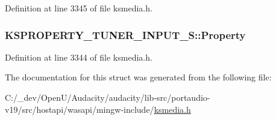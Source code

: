 Definition at line 3345 of file ksmedia.\+h.

\subsubsection[{\texorpdfstring{Property}{Property}}]{ K\+S\+P\+R\+O\+P\+E\+R\+T\+Y\+\_\+\+T\+U\+N\+E\+R\+\_\+\+I\+N\+P\+U\+T\+\_\+\+S\+::\+Property}\hypertarget{struct_k_s_p_r_o_p_e_r_t_y___t_u_n_e_r___i_n_p_u_t___s_ac63100c3dc0152d45a8b00bcc6e1df49}{}\label{struct_k_s_p_r_o_p_e_r_t_y___t_u_n_e_r___i_n_p_u_t___s_ac63100c3dc0152d45a8b00bcc6e1df49}


Definition at line 3344 of file ksmedia.\+h.



The documentation for this struct was generated from the following file\+:\begin{DoxyCompactItemize}
\item 
C\+:/\+\_\+dev/\+Open\+U/\+Audacity/audacity/lib-\/src/portaudio-\/v19/src/hostapi/wasapi/mingw-\/include/\hyperlink{ksmedia_8h}{ksmedia.\+h}\end{DoxyCompactItemize}
